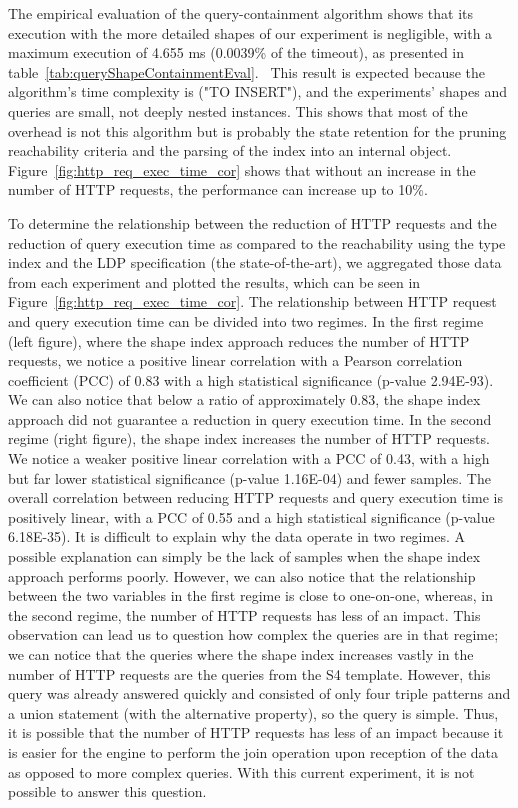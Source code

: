 The empirical evaluation of the query-containment algorithm shows that its execution with the more detailed shapes of our experiment is negligible, with a maximum execution of 4.655 ms (0.0039\% of the timeout), as presented in table~\ref{tab:queryShapeContainmentEval}.~
This result is expected because the algorithm's time complexity is ("TO INSERT"), and the experiments' shapes and queries are small, not deeply nested instances.
This shows that most of the overhead is not this algorithm but is probably the state retention for the pruning reachability criteria and the parsing of the index into an internal object.
Figure~\ref{fig:http_req_exec_time_cor} shows that without an increase in the number of HTTP requests, the performance can increase up to 10\%.


To determine the relationship between the reduction of HTTP requests and the reduction of query execution time as compared to the reachability using the type index and the LDP specification (the state-of-the-art),
we aggregated those data from each experiment and plotted the results, which can be seen in Figure~\ref{fig:http_req_exec_time_cor}.
The relationship between HTTP request and query execution time can be divided into two regimes.
In the first regime (left figure), where the shape index approach reduces the number of HTTP requests, we notice a positive linear correlation with a
Pearson correlation coefficient (PCC) of 0.83 with a high statistical significance (p-value 2.94E-93).
We can also notice that below a ratio of approximately 0.83, the shape index approach did not guarantee a reduction in query execution time.
In the second regime (right figure), the shape index increases the number of HTTP requests.
We notice a weaker positive linear correlation with a PCC of 0.43, with a high but far lower statistical significance (p-value 1.16E-04) and fewer samples.
The overall correlation between reducing HTTP requests and query execution time is positively linear, with a PCC of 0.55 and a high statistical significance (p-value 6.18E-35).
It is difficult to explain why the data operate in two regimes. 
A possible explanation can simply be the lack of samples when the shape index approach performs poorly.
However, we can also notice that the relationship between the two variables in the first regime is close to one-on-one, whereas, in the second regime, the number of HTTP requests has less of an impact.
This observation can lead us to question how complex the queries are in that regime; we can notice that the queries where the shape index increases vastly in the number 
of HTTP requests are the queries from the S4 template. 
However, this query was already answered quickly and consisted of only four triple patterns and a union statement (with the alternative property), so the query is simple. 
Thus, it is possible that the number of HTTP requests has less of an impact because it is easier for the engine to perform the join operation upon reception of the data as opposed to more complex queries.
With this current experiment, it is not possible to answer this question.
